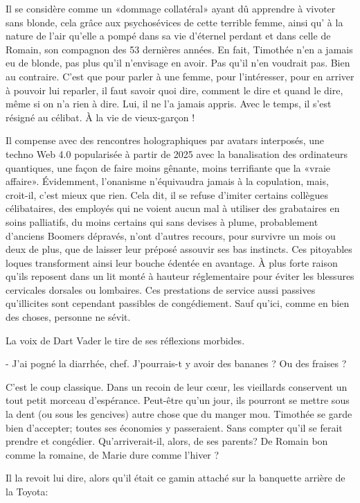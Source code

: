 Il se considère comme un «dommage collatéral» ayant dû apprendre à vivoter sans blonde, cela grâce aux psychosévices de cette terrible femme, ainsi qu’ à la nature de l’air qu’elle a pompé dans sa vie d’éternel perdant et dans celle de Romain, son compagnon des 53 dernières années. En fait, Timothée n’en a jamais eu de blonde, pas plus qu’il n’envisage en avoir. Pas qu’il n’en voudrait pas. Bien au contraire. C’est que pour parler à une femme, pour l’intéresser, pour en arriver à pouvoir lui reparler, il faut savoir quoi dire, comment le dire et quand le dire, même si on n’a rien à dire. Lui, il ne l’a jamais appris. Avec le temps, il s’est résigné au célibat. À la vie de vieux-garçon !

Il compense avec des rencontres holographiques par avatars interposés, une techno Web 4.0 popularisée à partir de 2025 avec la banalisation des ordinateurs quantiques, une façon de faire moins gênante, moins terrifiante que la «vraie affaire». Évidemment, l’onanisme n’équivaudra jamais à la copulation, mais, croit-il, c’est mieux que rien. Cela dit, il se refuse d’imiter certains collègues célibataires, des employés qui ne voient aucun mal à utiliser des grabataires en soins palliatifs, du moins certains qui sans devises à plume, probablement d’anciens Boomers dépravés, n’ont d’autres recours, pour survivre un mois ou deux de plus, que de laisser leur préposé assouvir ses bas instincts. Ces pitoyables loques transforment ainsi leur bouche édentée en avantage. À plus forte raison qu’ils reposent dans un lit monté à hauteur réglementaire pour éviter les blessures cervicales dorsales ou lombaires. Ces prestations de service aussi passives qu’illicites sont cependant passibles de congédiement. Sauf qu’ici, comme en bien des choses, personne ne sévit.

La voix de Dart Vader le tire de ses réflexions morbides.

- J’ai pogné la diarrhée, chef. J’pourrais-t y avoir des bananes ? Ou des fraises ?

C’est le coup classique. Dans un recoin de leur cœur, les vieillards conservent un tout petit morceau d’espérance. Peut-être qu’un jour, ils pourront se mettre sous la dent (ou sous les gencives) autre chose que du manger mou. Timothée se garde bien d’accepter; toutes ses économies y passeraient. Sans compter qu’il se ferait prendre et congédier. Qu’arriverait-il, alors, de ses parents? De Romain bon comme la romaine, de Marie dure comme l’hiver ?

Il la revoit lui dire, alors qu’il était ce gamin attaché sur la banquette arrière de la Toyota:


